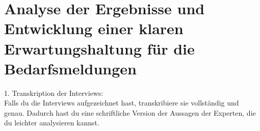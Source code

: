 \newpage

\section{Analyse der Ergebnisse und Entwicklung einer klaren Erwartungshaltung für die Bedarfsmeldungen}

1. Transkription der Interviews:\\
Falls du die Interviews aufgezeichnet hast, transkribiere sie vollständig und genau. Dadurch hast du eine schriftliche Version der Aussagen der Experten, die du leichter analysieren kannst.\\

